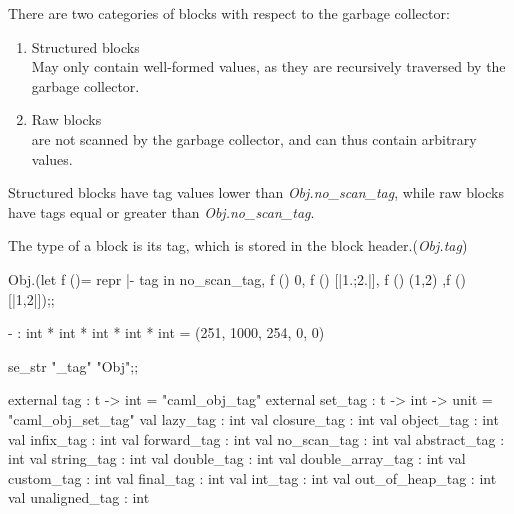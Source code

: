 \begin{enumerate}
  There are two categories of blocks with respect to the garbage collector:
  \begin{enumerate}
  \item Structured blocks \\
  May only contain well-formed values, as they are
  recursively traversed by the garbage collector.
  \item Raw blocks    \\
  are not scanned by the garbage collector, and can thus
  contain arbitrary values.
  \end{enumerate}
  Structured blocks have tag values lower than
  \textit{Obj.no\_scan\_tag}, while raw blocks have tags equal or
  greater than \textit{Obj.no\_scan\_tag}.
  

  The type of a block is its tag, which is stored in the block header.(\textit{Obj.tag})

  \begin{ocamlcode}
Obj.(let f ()= repr |- tag in no_scan_tag, f () 0, f () [|1.;2.|], f
() (1,2) ,f ()[|1,2|]);;
\end{ocamlcode}

\begin{ocamlcode}
- : int * int * int * int * int = (251, 1000, 254, 0, 0)    
\end{ocamlcode}

\begin{ocamlcode}
se_str "_tag" "Obj";;  
\end{ocamlcode}

\begin{ocamlcode}
    external tag : t -> int = "caml_obj_tag"
    external set_tag : t -> int -> unit = "caml_obj_set_tag"
    val lazy_tag : int
    val closure_tag : int
    val object_tag : int
    val infix_tag : int
    val forward_tag : int
    val no_scan_tag : int
    val abstract_tag : int
    val string_tag : int
    val double_tag : int
    val double_array_tag : int
    val custom_tag : int
    val final_tag : int
    val int_tag : int
    val out_of_heap_tag : int
    val unaligned_tag : int  
\end{ocamlcode}

\begin{enumerate}


\end{enumerate}
\end{enumerate}
